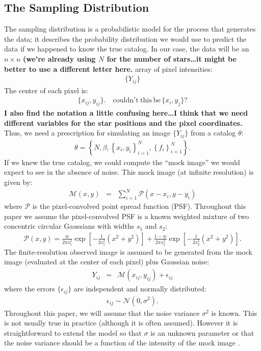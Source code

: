 \documentclass[letterpaper, 11pt]{article}
\begin{document}
\subsection{The Sampling Distribution}
The sampling distribution is a probabilistic model for the process that
generates the data; it describes the probability distribution we would use
to predict the data if we happened to know the true catalog. In our case,
the data will be an $n \times n$ {\bf (we're already using $N$ for the
number of stars\ldots it might be better to use a different letter here.}
array of pixel intensities:
\begin{eqnarray}
\{Y_{ij}\}
\end{eqnarray}
The center of each pixel is:
\begin{eqnarray}
    \{x_{ij}, y_{ij}\}. \quad \mathrm{couldn't~this~be}\,\{x_i, y_j\}?
\end{eqnarray}
{\bf I also find the notation a little confusing here\ldots I think that we
need different variables for the star positions and the pixel coordinates.}
Thus, we need
a prescription for simulating an image $\{Y_{ij}\}$ from a catalog $\theta$:
\begin{eqnarray}
\theta = \left\{N, \beta, \left\{x_i, y_i\right\}_{i=1}^N,
\left\{f_i\right\}_{i=1}^N\right\}.
\end{eqnarray}
If we knew the true catalog, we could compute the
``mock image'' we would expect to see
in the absence of noise. This mock image (at infinite resolution) is given by:
\begin{eqnarray}
\mathcal{M}(x, y) &=& \sum_{i=1}^N \mathcal{P}(x - x_i, y - y_i)
\end{eqnarray}
where $\mathcal{P}$ is the pixel-convolved point spread function (PSF).
Throughout this paper we
assume the pixel-convolved PSF is a known weighted mixture of two concentric
circular
Gaussians with widths $s_1$ and $s_2$:
\begin{eqnarray}
\mathcal{P}(x, y) = \frac{w}{2\pi s_1^2}\exp
\left[
-\frac{1}{2s_1^2}\left(x^2 + y^2\right)
\right]
+ \frac{1-w}{2\pi s_2^2}\exp
\left[-\frac{1}{2s_2^2}\left(x^2 + y^2\right)
\right].
\end{eqnarray}
The finite-resolution observed image is assumed to be generated from the mock
image (evaluated at the center of each pixel) plus Gaussian noise:
\begin{eqnarray}
Y_{ij} &=& \mathcal{M}(x_{ij}, y_{ij}) + \epsilon_{ij}
\end{eqnarray}
where the errors $\{\epsilon_{ij}\}$ are independent and normally distributed:
\begin{eqnarray}
\epsilon_{ij} \sim \mathcal{N}(0, \sigma^2).
\end{eqnarray}
Throughout this paper, we will assume that the noise variance $\sigma^2$ is
known. This is not usually true in practice (although it is often assumed).
However it is straightforward to extend the model so that $\sigma$ is an
unknown parameter or that the noise variance should be a function of the
intensity of the mock image \citep[e.g.][]{2011MNRAS.412.2521B}.
\end{document}
